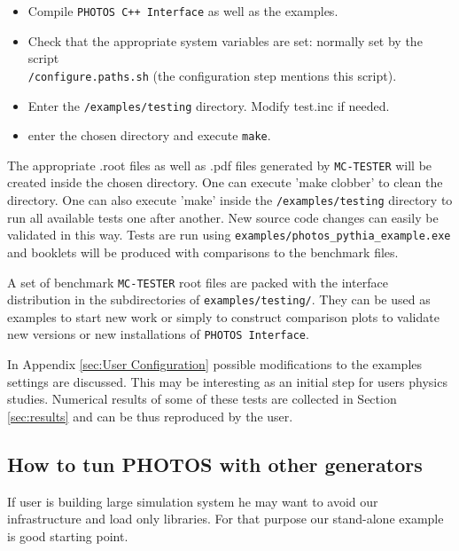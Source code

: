 \documentclass[]{Photos_interface_design}
\begin{document}
\begin{itemize}
  \item Compile {\tt PHOTOS C++ Interface} as well as the examples. 
 \item  Check that the appropriate system variables are set: normally set by the script \\
{\tt /configure.paths.sh} (the configuration step mentions this script).
  \item Enter the {\tt /examples/testing} directory. Modify test.inc if needed.
  \item enter the chosen directory and execute {\tt make}.
\end{itemize}

The appropriate .root files as well as .pdf files generated by {\tt MC-TESTER}
will be created inside the chosen directory. One can execute 'make clobber' to
clean the directory. One can also execute 'make' inside the {\tt /examples/testing}
directory to run all available tests one after another. New source
code changes can easily be validated in this way.
Tests are run using {\tt examples/photos\_pythia\_example.exe} 
and booklets will be produced with comparisons to the benchmark files.

A set of benchmark {\tt MC-TESTER} root files are packed with the interface
distribution in the subdirectories of {\tt examples/testing/}. They can be used
as examples to start new work or simply to construct comparison
plots to validate new versions or new installations of {\tt PHOTOS Interface}. 

In Appendix \ref{sec:User Configuration} possible modifications to the  
examples settings are discussed. This may be interesting as an initial step for users 
physics studies.  Numerical results of some of these tests are collected in Section \ref{sec:results}
and can be thus reproduced by the user.

\subsection{How to tun PHOTOS with other generators}
If user is building large simulation system he may want to avoid our 
infrastructure and load only libraries. For that purpose our stand-alone 
example is good starting point.
\end{document}

